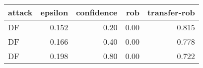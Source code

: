 \begin{tabular}{lrrrr}
\toprule
attack & epsilon & confidence & rob & transfer-rob \\
\midrule
DF & 0.152 & 0.20 & 0.00 & 0.815 \\
DF & 0.166 & 0.40 & 0.00 & 0.778 \\
DF & 0.198 & 0.80 & 0.00 & 0.722 \\
\bottomrule
\end{tabular}
